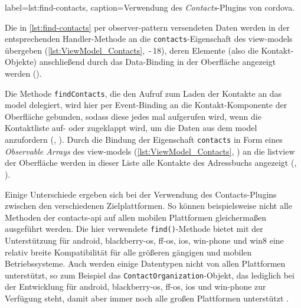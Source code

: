 	 { label=lst:find-contacts, caption={Verwendung des \emph{Contacts}-Plugins von \gls{cordova}.}}

Die in \autoref{lst:find-contacts} per \gls{observer-pattern} versendeten Daten werden in der entsprechenden Handler-Methode an die \lstinline|contacts|-Eigenschaft des \glspl{view-model} übergeben (\autoref{lst:ViewModel_Contacts}, \,-\,18), deren Elemente (also die Kontakt-Objekte) anschließend durch das Data-Binding in der Oberfläche angezeigt werden (\su).


Die Methode \lstinline|findContacts|, die den Aufruf zum Laden der Kontakte an das \gls{model} delegiert, wird hier per Event-Binding an die Kontakt-Komponente der Oberfläche gebunden, sodass diese jedes mal aufgerufen wird, wenn die Kontaktliste auf- oder zugeklappt wird, um die Daten aus dem \gls{model} anzufordern (, ).
Durch die Bindung der Eigenschaft \lstinline|contacts| in Form eines \emph{Observable Arrays} des \glspl{view-model} (\autoref{lst:ViewModel_Contacts}, ) an die \gls{listview} der Oberfläche werden in dieser Liste alle Kontakte des Adressbuchs angezeigt (, ).

		
Einige Unterschiede ergeben sich bei der Verwendung des Contacts-Plugins zwischen den verschiedenen Zielplattformen.
So können beispielsweise nicht alle Methoden der contacts-\gls{api} auf allen mobilen Plattformen gleichermaßen ausgeführt werden.
Die hier verwendete \lstinline|find()|-Methode bietet mit der Unterstützung für \gls{android}, \gls{blackberry-os}, \gls{ff-os}, \gls{ios}, \gls{win-phone} und \gls{win8} eine relativ  breite Kompatibilität für alle größeren gängigen und mobilen Betriebssysteme.
Auch werden einige Datentypen nicht von allen Plattformen unterstützt, so zum Beispiel das \lstinline|ContactOrganization|-Objekt, das lediglich bei der Entwicklung für \gls{android}, \gls{blackberry-os}, \gls{ff-os}, \gls{ios} und \gls{win-phone} zur Verfügung steht, damit aber immer noch alle großen Plattformen unterstützt \cite{Cordova_Plugin_Registry_Contacts}.

